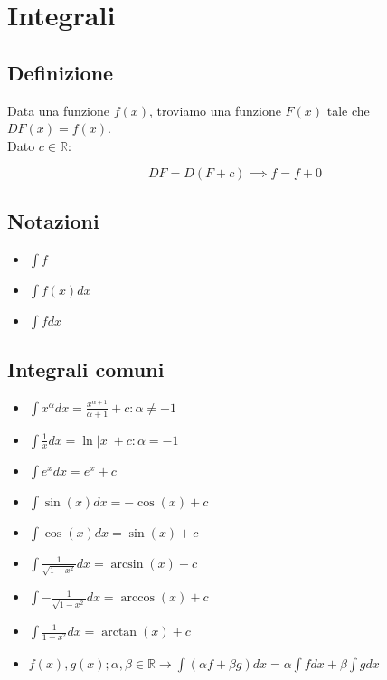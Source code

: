 \documentclass{article}
\begin{document}
\section{Integrali}

\subsection{Definizione}

Data una funzione $f(x)$, troviamo una funzione $F(x)$ tale che $DF(x) = f(x)$.\\

\noindent
Dato $c \in \mathbb{R}$:

$$
DF = D(F + c) \implies f = f + 0
$$

\subsection{Notazioni}

\begin{itemize}
	\item $\int f$
	\item $\int f(x)dx$
	\item $\int fdx$
\end{itemize}

\subsection{Integrali comuni}

\begin{itemize}
	\item $\int x^\alpha dx = \frac{x^{\alpha + 1}}{\alpha + 1} + c : \alpha \neq -1$
	\item $\int \frac{1}{x} dx = \ln|x| + c : \alpha = -1$
	\item $\int e^x dx = e^x + c$
	\item $\int \sin(x) dx = -\cos(x) + c$
	\item $\int \cos(x) dx = \sin(x) + c$
	\item $\int \frac{1}{\sqrt{1 - x^2}} dx = \arcsin(x) + c$
	\item $\int -\frac{1}{\sqrt{1 - x^2}} dx = \arccos(x) + c$
	\item $\int \frac{1}{1 + x^2} dx = \arctan(x) + c$
	\item $f(x), g(x); \alpha, \beta \in \mathbb{R} \rightarrow \int (\alpha f + \beta g)dx = \alpha \int fdx + \beta \int gdx$
\end{itemize}
\end{document}
